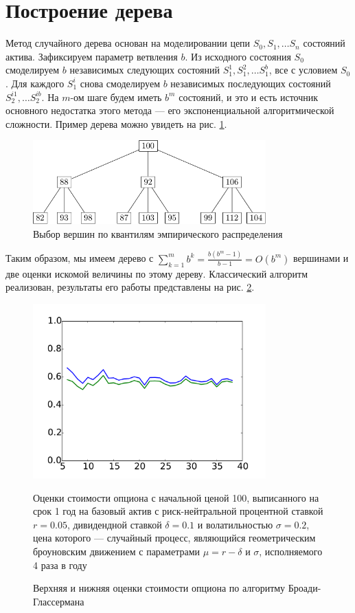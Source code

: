 \documentclass[specialist,
               substylefile = spbu.rtx,
               subf,href,colorlinks=true, 12pt]{disser}
\begin{document}
	\section{Построение дерева}
	\par Метод случайного дерева основан на моделировании цепи $S_0, S_1, \ldots S_n$ состояний актива. Зафиксируем параметр ветвления $b$. Из исходного состояния $S_0$ смоделируем $b$ независимых следующих состояний $S_1^1, S_1^2, \ldots S_1^b$, все с условием $S_0$. Для каждого $S_1^i$ снова смоделируем $b$ независимых последующих состояний $S_2^{i1}, \ldots S_2^{ib}$. На $m$-ом шаге будем иметь $b^m$ состояний, и это и есть источник основного недостатка этого метода --- его экспоненциальной алгоритмической сложности. Пример дерева можно увидеть на рис. \ref{fig:exponentialTree}.
	\begin{figure}[h]
	    \centering
		\includegraphics[width=0.8\textwidth, height=0.15\paperheight]{tree_sample.pdf}
		\caption{Выбор вершин по квантилям эмпирического распределения}
		\label{fig:exponentialTree}
	\end{figure}
	\par Таким образом, мы имеем дерево с $\sum_{k=1}^m b^k = \frac{b\left(b^m-1\right)}{b-1} = O\left(b^m\right)$ вершинами и две оценки искомой величины по этому дереву. Классический алгоритм реализован, результаты его работы представлены на рис. \ref{fig:true_value_test_standard}.
	\begin{figure}[h]
	    \centering
		\includegraphics[width=0.8\textwidth]{true_value_test_standard}
		\caption{Верхняя и нижняя оценки стоимости опциона по алгоритму Броади-Глассермана}
		\label{fig:true_value_test_standard}
		\footnotesize{Оценки стоимости опциона с начальной ценой 100, выписанного на срок 1 год на базовый актив с риск-нейтральной процентной ставкой $r = 0.05$, дивидендной ставкой $\delta = 0.1$ и волатильностью $\sigma=0.2$, цена которого --- случайный процесс, являющийся геометрическим броуновским движением с параметрами $\mu = r - \delta$ и $\sigma$, исполняемого 4 раза в году}
	\end{figure}
\end{document}
